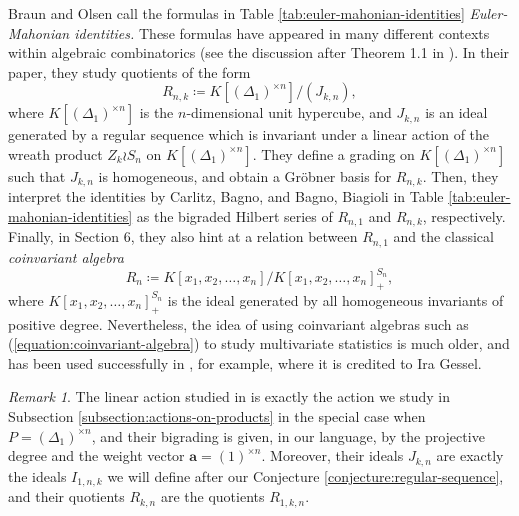 \documentclass[a4paper,12pt]{amsart}
\theoremstyle{plain}
\theoremstyle{definition}
\theoremstyle{remark}
\newtheorem{remark}[theorem]{Remark}
\begin{document}
Braun and Olsen \cite{braun-olsen-statistics} call the formulas in Table \ref{tab:euler-mahonian-identities} \emph{Euler-Mahonian identities.} These formulas have appeared in many different contexts within algebraic combinatorics (see the discussion after Theorem 1.1 in \cite{braun-olsen-statistics}). In their paper, they study quotients of the form
\[
R_{n, k} \coloneq K[(\Delta_1)^{\times n}]/(J_{k, n}),
\]
where $K[(\Delta_1)^{\times n}]$ is the $n$-dimensional unit hypercube, and $J_{k, n}$ is an ideal generated by a regular sequence which is invariant under a linear action of the wreath product $Z_k \wr S_n$ on $K[(\Delta_1)^{\times n}]$. They define a grading on $K[(\Delta_1)^{\times n}]$ such that $J_{k, n}$ is homogeneous, and obtain a Gr\"{o}bner basis for $R_{n, k}$. Then, they interpret the identities by Carlitz, Bagno, and Bagno, Biagioli in Table \ref{tab:euler-mahonian-identities} as the bigraded Hilbert series of $R_{n, 1}$ and $R_{n, k}$, respectively. Finally, in Section 6, they also hint at a relation between $R_{n, 1}$ and the classical \emph{coinvariant algebra}
\begin{equation}\label{equation:coinvariant-algebra}
    R_n \coloneq K[x_1, x_2, \ldots, x_n]/K[x_1, x_2, \ldots, x_n]_+^{S_n},
\end{equation}
where $K[x_1, x_2, \ldots, x_n]_+^{S_n}$ is the ideal generated by all homogeneous invariants of positive degree. Nevertheless, the idea of using coinvariant algebras such as (\ref{equation:coinvariant-algebra}) to study multivariate statistics is much older, and has been used successfully in \cite{adin-brenti-roichman-descent}, for example, where it is credited to Ira Gessel. 
\begin{remark}
    The linear action studied in \cite{braun-olsen-statistics} is exactly the action we study in Subsection \ref{subsection:actions-on-products} in the special case when $P = (\Delta_1)^{\times n}$, and their bigrading is given, in our language, by the projective degree and the weight vector $\bm{a} = (1)^{\times n}$. Moreover, their ideals $J_{k, n}$ are exactly the ideals $I_{1, n, k}$ we will define after our Conjecture \ref{conjecture:regular-sequence}, and their quotients $R_{k, n}$ are the quotients $R_{1, k, n}$.
\end{remark}
\end{document}
